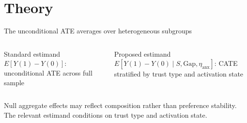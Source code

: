 \documentclass[aspectratio=169,11pt]{beamer}
\begin{document}
\section{Theory}

\begin{frame}{The unconditional ATE averages over heterogeneous subgroups}

\begin{columns}[c]
\begin{block}{Standard estimand}
$E[Y(1) - Y(0)]$: unconditional ATE across full sample
\end{block}

\begin{exampleblock}{Proposed estimand}
$E[Y(1) - Y(0) \mid S, \text{Gap}, \eta_{\text{anx}}]$: CATE stratified by trust type and activation state
\end{exampleblock}
\end{columns}

\vspace{0.5cm}
{\small Null aggregate effects may reflect composition rather than preference stability. The relevant estimand conditions on trust type and activation state.}

\end{frame}
\end{document}
